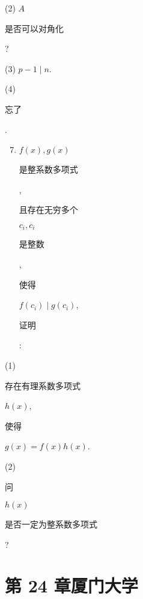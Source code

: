 \documentclass[10pt]{article}
\begin{document}
(2) $A$ \begin{CJK}{UTF8}{mj}是否可以对角化\end{CJK}?

(3) $p-1 \mid n$.

(4) \begin{CJK}{UTF8}{mj}忘了\end{CJK}.

\begin{enumerate}
  \setcounter{enumi}{6}
  \item $f(x), g(x)$ \begin{CJK}{UTF8}{mj}是整系数多项式\end{CJK}, \begin{CJK}{UTF8}{mj}且存在无穷多个\end{CJK} $c_{i}, c_{i}$ \begin{CJK}{UTF8}{mj}是整数\end{CJK}, \begin{CJK}{UTF8}{mj}使得\end{CJK} $f\left(c_{i}\right) \mid g\left(c_{i}\right)$, \begin{CJK}{UTF8}{mj}证明\end{CJK}:
\end{enumerate}
(1) \begin{CJK}{UTF8}{mj}存在有理系数多项式\end{CJK} $h(x)$, \begin{CJK}{UTF8}{mj}使得\end{CJK} $g(x)=f(x) h(x)$.

(2) \begin{CJK}{UTF8}{mj}问\end{CJK} $h(x)$ \begin{CJK}{UTF8}{mj}是否一定为整系数多项式\end{CJK}?

\section{第 24 章厦门大学}
\end{document}
